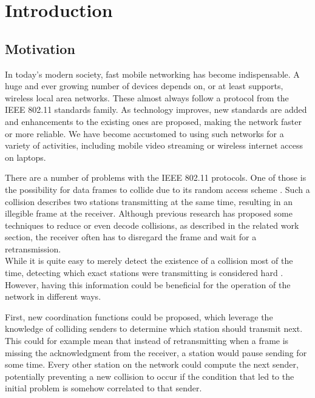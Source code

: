 \chapter{Introduction}\label{ch:introduction}
\glsresetall %



\section{Motivation}

In today's modern society, fast mobile networking has become indispensable. A huge and ever growing number of devices depends on, or at least supports, wireless local area networks. These almost always follow a protocol from the IEEE 802.11 standards family. As technology improves, new standards are added and enhancements to the existing ones are proposed, making the network faster or more reliable. We have become accustomed to using such networks for a variety of activities, including mobile video streaming or wireless internet access on laptops.

There are a number of problems with the \gls{IEEE} 802.11 protocols. One of those is the possibility for data frames to collide due to its random access scheme \cite{bianchi2000}. Such a collision describes two stations transmitting at the same time, resulting in an illegible frame at the receiver. Although previous research has proposed some techniques to reduce or even decode collisions, as described in the related work section, the receiver often has to disregard the frame and wait for a retransmission.\\

While it is quite easy to merely detect the existence of a collision most of the time, detecting which exact stations were transmitting is considered hard \cite{choi2013, keene2010}. However, having this information could be beneficial for the operation of the network in different ways.

First, new coordination functions could be proposed, which leverage the knowledge of colliding senders to determine which station should transmit next. This could for example mean that instead of retransmitting when a frame is missing the acknowledgment from the receiver, a station would pause sending for some time. Every other station on the network could compute the next sender, potentially preventing a new collision to occur if the condition that led to the initial problem is somehow correlated to that sender.

